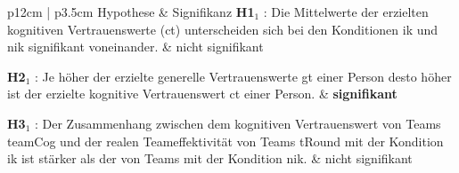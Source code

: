 \documentclass[a4paper,11pt]{article}%
\renewcommand{\\}{\vspace*{0.5\baselineskip} \newline}
\begin{document}
\begin{table}[H]
	\centering\footnotesize{}
	\caption[Signifikanz der Hypothesen]{Signifikanz der Hypothesen}
	\label{SignifikanzOverview}
	\begin{tabularx}{\textwidth}{p{12cm} | p{3.5cm}} 
		Hypothese & Signifikanz  \\
		\hline \\
\textbf{H1$_{1}$} : Die Mittelwerte der erzielten kognitiven Vertrauenswerte (\ac{ct}) unterscheiden sich bei den Konditionen \ac{ik} und \ac{nik} signifikant voneinander.\\
		& nicht signifikant \\
		\hline \\
		
				\textbf{H2$_{1}$} : Je höher der erzielte generelle Vertrauenswerte \ac{gt} einer Person desto höher ist der erzielte kognitive Vertrauenswert \ac{ct} einer Person.
		& \textbf{signifikant} \\
		
		\hline 	\\	
%
\textbf{H3$_{1}$} : Der Zusammenhang zwischen dem kognitiven Vertrauenswert von Teams \ac{teamCog} und der realen Teameffektivität von Teams \ac{tRound} mit der Kondition \ac{ik} ist stärker als der von Teams mit der Kondition \ac{nik}. \\
		& nicht signifikant \\		
		

\end{tabularx}
\end{table}
\end{document}
